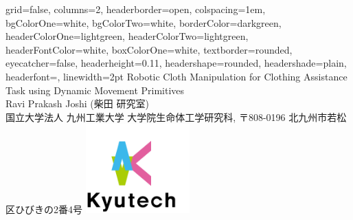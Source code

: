 \documentclass[a0paper,portrait]{baposter}
\begin{document}

\begin{poster}{
		grid=false,
		columns=2, %
		headerborder=open, %
		colspacing=1em, %
		bgColorOne=white, %
		bgColorTwo=white, %
		borderColor=darkgreen, %
		headerColorOne=lightgreen, %
		headerColorTwo=lightgreen, %
		headerFontColor=white, %
		boxColorOne=white, %
		textborder=rounded, %
		eyecatcher=false, %
		headerheight=0.11\textheight, %
		headershape=rounded, %
		headershade=plain,
		headerfont=\Large\textsf, %
		linewidth=2pt %
	}{}
	{\vspace{1em}
		\textsf %
		{Robotic Cloth Manipulation for Clothing Assistance Task using Dynamic Movement Primitives}
	} %
	{\sf\vspace{0.1em}\\
		Ravi Prakash Joshi (柴田 研究室)
		\vspace{0.1em}\\
		\small{国立大学法人 九州工業大学 大学院生命体工学研究科, 〒808-0196 北九州市若松区ひびきの2番4号}}
	{\includegraphics[trim={5mm 5mm 30mm 10mm}, clip, width=4cm]{logo}} %



\end{poster}
\end{document}
